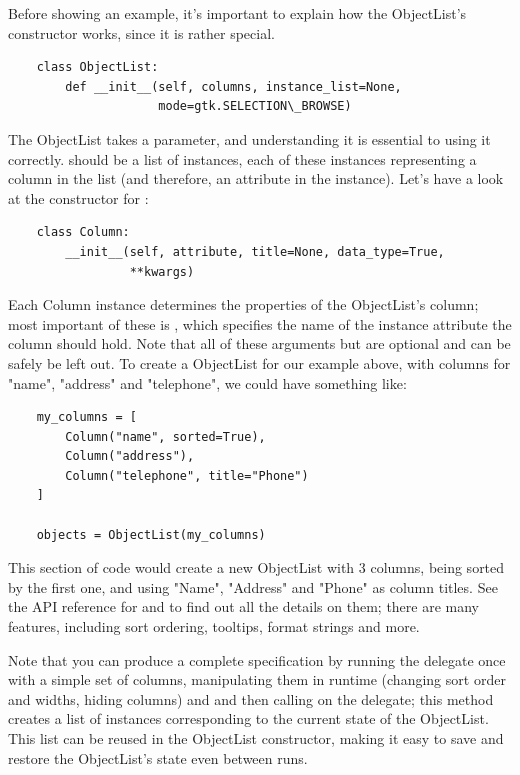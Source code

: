 \documentclass[a4paper]{howto}
\begin{document}
Before showing an example, it's important to explain how the
ObjectList's constructor works, since it is rather special.

    \begin{verbatim}
    class ObjectList:
        def __init__(self, columns, instance_list=None,
                     mode=gtk.SELECTION\_BROWSE)
    \end{verbatim}

The ObjectList takes a  parameter, and understanding it
is essential to using it correctly.  should be a list of
 instances, each of these instances representing a column
in the list (and therefore, an attribute in the instance). Let's have a
look at the constructor for :

    \begin{verbatim}
    class Column:
        __init__(self, attribute, title=None, data_type=True,
                 **kwargs)
    \end{verbatim}

Each Column instance determines the properties of the ObjectList's column;
most important of these is , which specifies the name of
the instance attribute the column should hold. Note that all of these
arguments but  are optional and can be safely be left
out. To create a ObjectList for our example above, with columns for "name",
"address" and "telephone", we could have something like:

    \begin{verbatim}
    my_columns = [
        Column("name", sorted=True),
        Column("address"),
        Column("telephone", title="Phone")
    ]

    objects = ObjectList(my_columns)
    \end{verbatim}

This section of code would create a new ObjectList with 3 columns,
being sorted by the first one, and using "Name", "Address" and "Phone"
as column titles. See the API reference for  and
 to find out all the details on them; there are many
features, including sort ordering, tooltips, format strings and more.

Note that you can produce a complete  specification by
running the delegate once with a simple set of columns, manipulating
them in runtime (changing sort order and widths, hiding columns) and and
then calling  on the delegate; this method creates
a list of  instances corresponding to the current state of
the ObjectList. This list can be reused in the ObjectList constructor,
making it easy to save and restore the ObjectList's state even between runs.
\end{document}

